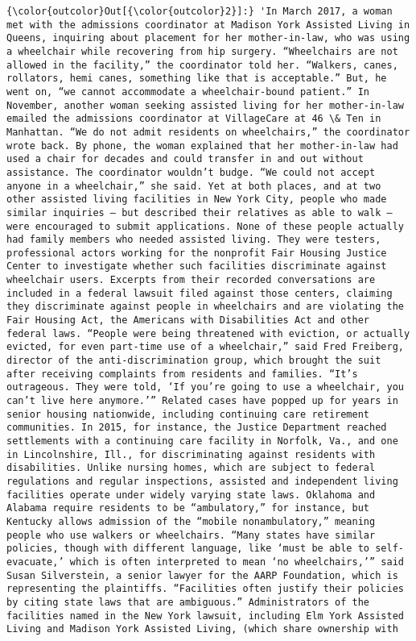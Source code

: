 \documentclass[11pt]{article}
\begin{document}
\begin{Verbatim}[commandchars=\\\{\}]
{\color{outcolor}Out[{\color{outcolor}2}]:} 'In March 2017, a woman met with the admissions coordinator at Madison York Assisted Living in Queens, inquiring about placement for her mother-in-law, who was using a wheelchair while recovering from hip surgery. “Wheelchairs are not allowed in the facility,” the coordinator told her. “Walkers, canes, rollators, hemi canes, something like that is acceptable.” But, he went on, “we cannot accommodate a wheelchair-bound patient.” In November, another woman seeking assisted living for her mother-in-law emailed the admissions coordinator at VillageCare at 46 \& Ten in Manhattan. “We do not admit residents on wheelchairs,” the coordinator wrote back. By phone, the woman explained that her mother-in-law had used a chair for decades and could transfer in and out without assistance. The coordinator wouldn’t budge. “We could not accept anyone in a wheelchair,” she said. Yet at both places, and at two other assisted living facilities in New York City, people who made similar inquiries — but described their relatives as able to walk — were encouraged to submit applications. None of these people actually had family members who needed assisted living. They were testers, professional actors working for the nonprofit Fair Housing Justice Center to investigate whether such facilities discriminate against wheelchair users. Excerpts from their recorded conversations are included in a federal lawsuit filed against those centers, claiming they discriminate against people in wheelchairs and are violating the Fair Housing Act, the Americans with Disabilities Act and other federal laws. “People were being threatened with eviction, or actually evicted, for even part-time use of a wheelchair,” said Fred Freiberg, director of the anti-discrimination group, which brought the suit after receiving complaints from residents and families. “It’s outrageous. They were told, ‘If you’re going to use a wheelchair, you can’t live here anymore.’” Related cases have popped up for years in senior housing nationwide, including continuing care retirement communities. In 2015, for instance, the Justice Department reached settlements with a continuing care facility in Norfolk, Va., and one in Lincolnshire, Ill., for discriminating against residents with disabilities. Unlike nursing homes, which are subject to federal regulations and regular inspections, assisted and independent living facilities operate under widely varying state laws. Oklahoma and Alabama require residents to be “ambulatory,” for instance, but Kentucky allows admission of the “mobile nonambulatory,” meaning people who use walkers or wheelchairs. “Many states have similar policies, though with different language, like ‘must be able to self-evacuate,’ which is often interpreted to mean ‘no wheelchairs,’” said Susan Silverstein, a senior lawyer for the AARP Foundation, which is representing the plaintiffs. “Facilities often justify their policies by citing state laws that are ambiguous.” Administrators of the facilities named in the New York lawsuit, including Elm York Assisted Living and Madison York Assisted Living, (which share ownership with 
\end{Verbatim}
\end{document}
